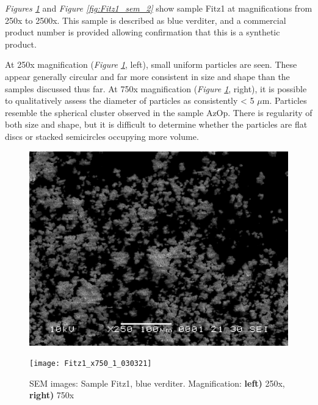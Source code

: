 \textit{Figures \ref{fig:Fitz1_sem_1}} and \textit{Figure \ref{fig:Fitz1_sem_2}} show sample Fitz1 at magnifications from 250x to 2500x. This sample is described as blue verditer, and a commercial product number is provided allowing confirmation that this is a synthetic product.

At 250x magnification (\textit{Figure \ref{fig:Fitz1_sem_1}}, left), small uniform particles are seen. These appear generally circular and far more consistent in size and shape than the samples discussed thus far. At 750x magnification (\textit{Figure \ref{fig:Fitz1_sem_1}}, right), it is possible to qualitatively assess the diameter of particles as consistently < 5 $\mu$m. Particles resemble the spherical cluster observed in the sample AzOp. There is regularity of both size and shape, but it is difficult to determine whether the particles are flat discs or stacked semicircles occupying more volume.

\begin{figure}[H]
\centering
\begin{minipage}{.45\textwidth}
  \centering
  \includegraphics[width=\linewidth]{Fitz1_x250_1_030321}
\end{minipage}
\begin{minipage}{.45\textwidth}
  \centering
  \texttt{[image: Fitz1\_x750\_1\_030321]}
\end{minipage}
\caption[SEM images: Sample Fitz1, blue verditer]{SEM images: Sample Fitz1, blue verditer. Magnification: \textbf{left)} 250x, \textbf{right)} 750x}
\label{fig:Fitz1_sem_1}
\end{figure}

